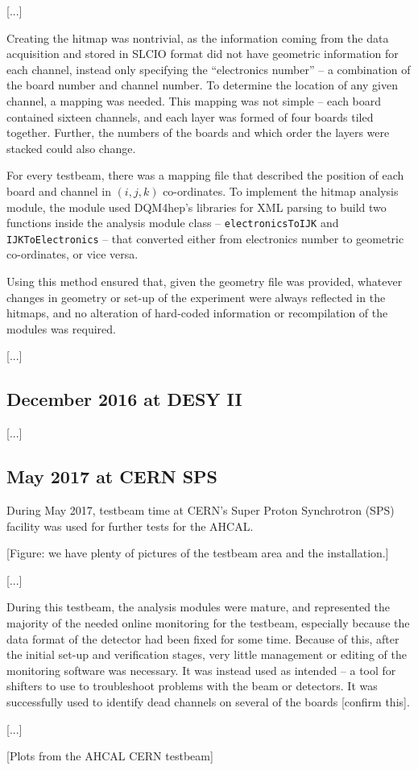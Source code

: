 [...]

Creating the hitmap was nontrivial, as the information coming from the data acquisition and stored in SLCIO format did not have geometric information for each channel, instead only specifying the ``electronics number'' -- a combination of the board number and channel number. To determine the location of any given channel, a mapping was needed. This mapping was not simple -- each board contained sixteen channels, and each layer was formed of four boards tiled together. Further, the numbers of the boards and which order the layers were stacked could also change.

For every testbeam, there was a mapping file that described the position of each board and channel in $(i, j, k)$ co-ordinates. To implement the hitmap analysis module, the module used DQM4hep's libraries for XML parsing to build two functions inside the analysis module class --  \texttt{electronicsToIJK} and \texttt{IJKToElectronics} -- that converted either from electronics number to geometric co-ordinates, or vice versa.

Using this method ensured that, given the geometry file was provided, whatever changes in geometry or set-up of the experiment were always reflected in the hitmaps, and no alteration of hard-coded information or recompilation of the modules was required.

[...]

\subsection{December 2016 at DESY II}
[...]

\subsection{May 2017 at CERN SPS}

During May 2017, testbeam time at CERN's Super Proton Synchrotron (SPS) facility was used for further tests for the AHCAL.

\begin{center}
	[Figure: we have plenty of pictures of the testbeam area and the installation.]
\end{center}

[...]

During this testbeam, the analysis modules were mature, and represented the majority of the needed online monitoring for the testbeam, especially because the data format of the detector had been fixed for some time. Because of this, after the initial set-up and verification stages, very little management or editing of the monitoring software was necessary. It was instead used as intended -- a tool for shifters to use to troubleshoot problems with the beam or detectors. It was successfully used to identify dead channels on several of the boards [confirm this].

[...]

\begin{center}
	[Plots from the AHCAL CERN testbeam]
\end{center}
